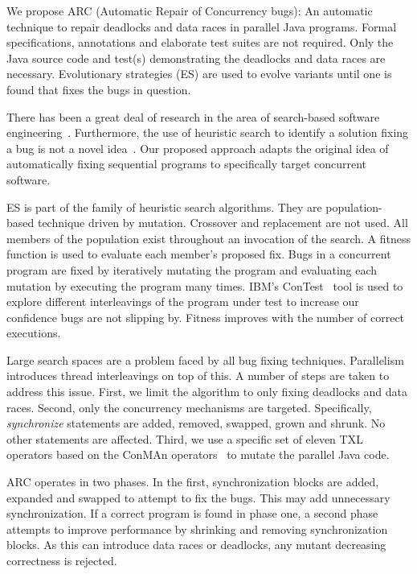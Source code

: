 \documentclass{llncs}
\begin{document}
We propose ARC (Automatic Repair of Concurrency bugs): An automatic technique
to repair deadlocks and data races in parallel Java programs. Formal
specifications, annotations and elaborate test suites are not required. Only
the Java source code and test(s) demonstrating the deadlocks and data races are
necessary. Evolutionary strategies (ES) are used to evolve variants until one is
found that fixes the bugs in question.

There has been a great deal of research in the area of search-based software
engineering~\cite{Har+10}. Furthermore, the use of heuristic search to identify
a solution fixing a bug is not a novel idea~\cite{FNWG09, AY08, Arc08, WT10,
WNLF09, WFGN10}. Our proposed approach adapts the original idea of
automatically fixing sequential programs to specifically target concurrent
software.

ES is part of the family of heuristic search algorithms. They are population-
based technique driven by mutation. Crossover and replacement are not used. All
members of the population exist throughout an invocation of the search. A
fitness function is used to evaluate each member's proposed fix. Bugs in a
concurrent program are fixed by iteratively mutating the program and evaluating
each mutation by executing the program many times. IBM's ConTest~\cite{EFN+02}
tool is used to explore different interleavings of the program under test to
increase our confidence bugs are not slipping by. Fitness improves with the
number of correct executions.

Large search spaces are a problem faced by all bug fixing techniques.
Parallelism introduces thread interleavings on top of this. A number of steps
are taken to address this issue. First, we limit the algorithm to only fixing
deadlocks and data races. Second, only the concurrency mechanisms are targeted.
Specifically, \textit{synchronize} statements are added, removed, swapped,
grown and shrunk. No other statements are affected. Third, we use a specific
set of eleven TXL~\cite{CHP91} operators based on the ConMAn
operators~\cite{BCD06} to mutate the parallel Java code.

ARC operates in two phases. In the first, synchronization blocks are added,
expanded and swapped to attempt to fix the bugs. This may add unnecessary
synchronization. If a correct program is found in phase one, a second phase
attempts to improve performance by shrinking and removing synchronization
blocks. As this can introduce data races or deadlocks, any mutant decreasing
correctness is rejected.
\end{document}
